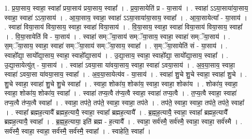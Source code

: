 \documentclass[17pt]{extarticle}
\begin{document}
1. प्र॒या॒साय॒ स्वाहा॒ स्वाहा᳚ प्रया॒साय॑ प्रया॒साय॒ स्वाहा᳚ । . प्र॒या॒सायेति॑ प्र - या॒साय॑ । . स्वाहा॑ ऽऽया॒साया॑या॒साय॒ स्वाहा॒ स्वाहा॑ ऽऽया॒साय॑ । . आ॒या॒साय॒ स्वाहा॒ स्वाहा॑ ऽऽया॒साया॑या॒साय॒ स्वाहा᳚ । . आ॒या॒सायेत्या᳚ - या॒साय॑ । . स्वाहा॑ विया॒साय॑ विया॒साय॒ स्वाहा॒ स्वाहा॑ विया॒साय॑ । . वि॒या॒साय॒ स्वाहा॒ स्वाहा॑ विया॒साय॑ विया॒साय॒ स्वाहा᳚ । . वि॒या॒सायेति॑ वि - या॒साय॑ । . स्वाहा॑ सम्ॅया॒साय॑ सम्ॅया॒साय॒ स्वाहा॒ स्वाहा॑ सम्ॅया॒साय॑ । . स॒म्ॅया॒साय॒ स्वाहा॒ स्वाहा॑ सम्ॅया॒साय॑ सम्ॅया॒साय॒ स्वाहा᳚ । . स॒म्ॅया॒सायेति॑ सं - या॒साय॑ । . स्वाहो᳚द्या॒ सायो᳚द्या॒साय॒ स्वाहा॒ स्वाहो᳚द्या॒साय॑ । . उ॒द्या॒साय॒ स्वाहा॒ स्वाहो᳚द्या॒ सायो᳚द्या॒साय॒ स्वाहा᳚ । . उ॒द्या॒सायेत्यु॑त् - या॒साय॑ । . स्वाहा॑ ऽवया॒सा या॑वया॒साय॒ स्वाहा॒ स्वाहा॑ ऽवया॒साय॑ । . अ॒व॒या॒साय॒ स्वाहा॒ स्वाहा॑ ऽवया॒सा या॑वया॒साय॒ स्वाहा᳚ । . अ॒व॒या॒सायेत्य॑व - या॒साय॑ । . स्वाहा॑ शु॒चे शु॒चे स्वाहा॒ स्वाहा॑ शु॒चे । . शु॒चे स्वाहा॒ स्वाहा॑ शु॒चे शु॒चे स्वाहा᳚ । . स्वाहा॒ शोका॑य॒ शोका॑य॒ स्वाहा॒ स्वाहा॒ शोका॑य । . शोका॑य॒ स्वाहा॒ स्वाहा॒ शोका॑य॒ शोका॑य॒ स्वाहा᳚ । . स्वाहा॑ तप्य॒त्वै त॑प्य॒त्वै स्वाहा॒ स्वाहा॑ तप्य॒त्वै । . त॒प्य॒त्वै स्वाहा॒ स्वाहा॑ तप्य॒त्वै त॑प्य॒त्वै स्वाहा᳚ । . स्वाहा॒ तप॑ते॒ तप॑ते॒ स्वाहा॒ स्वाहा॒ तप॑ते । . तप॑ते॒ स्वाहा॒ स्वाहा॒ तप॑ते॒ तप॑ते॒ स्वाहा᳚ । . स्वाहा᳚ ब्रह्मह॒त्यायै᳚ ब्रह्मह॒त्यायै॒ स्वाहा॒ स्वाहा᳚ ब्रह्मह॒त्यायै᳚ । . ब्र॒ह्म॒ह॒त्यायै॒ स्वाहा॒ स्वाहा᳚ ब्रह्मह॒त्यायै᳚ ब्रह्मह॒त्यायै॒ स्वाहा᳚ । . ब्र॒ह्म॒ह॒त्याया॒ इति॑ ब्रह्म - ह॒त्यायै᳚ । . स्वाहा॒ सर्व॑स्मै॒ सर्व॑स्मै॒ स्वाहा॒ स्वाहा॒ सर्व॑स्मै । . सर्व॑स्मै॒ स्वाहा॒ स्वाहा॒ सर्व॑स्मै॒ सर्व॑स्मै॒ स्वाहा᳚ । . स्वाहेति॒ स्वाहा᳚ । \newline
\end{document}
